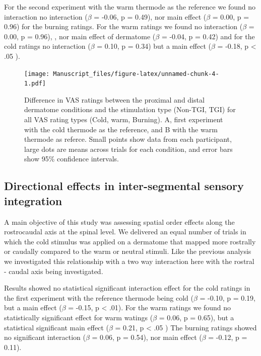 \documentclass[
]{article}
\begin{document}
For the second experiment with the warm thermode as the reference we
found no interaction no interaction (\(\beta\) = -0.06, p = 0.49), nor
main effect (\(\beta\) = 0.00, p = 0.96) for the burning ratings. For
the warm ratings we found no interaction (\(\beta\) = 0.00, p = 0.96), ,
nor main effect of dermatome (\(\beta\) = -0.04, p = 0.42) and for the
cold ratings no interaction (\(\beta\) = 0.10, p = 0.34) but a main
effect (\(\beta\) = -0.18, p \textless{} .05 ).

\begin{figure}
\centering
\texttt{[image: Manuscript\_files/figure-latex/unnamed-chunk-4-1.pdf]}
\caption{Difference in VAS ratings between the proximal and distal
dermatome conditions and the stimulation type (Non-TGI, TGI) for all VAS
rating types (Cold, warm, Burning). A, first experiment with the cold
thermode as the reference, and B with the warm thermode as referce.
Small points show data from each participant, large dots are means
across trials for each condition, and error bars show 95\% confidence
intervals.}
\end{figure}

\hypertarget{directional-effects-in-inter-segmental-sensory-integration}{%
\subsection{Directional effects in inter-segmental sensory
integration}\label{directional-effects-in-inter-segmental-sensory-integration}}

A main objective of this study was assessing spatial order effects along
the rostrocaudal axis at the spinal level. We delivered an equal number
of trials in which the cold stimulus was applied on a dermatome that
mapped more rostrally or caudally compared to the warm or neutral
stimuli. Like the previous analysis we investigated this relationship
with a two way interaction here with the rostral - caudal axis being
investigated.

Results showed no statistical significant interaction effect for the
cold ratings in the first experiment with the reference thermode being
cold (\(\beta\) = -0.10, p = 0.19, but a main effect (\(\beta\) = -0.15,
p \textless{} .01). For the warm ratings we found no statistically
significant effect for warm watings (\(\beta\) = 0.06, p = 0.65), but a
statistical significant main effect (\(\beta\) = 0.21, p \textless{} .05
) The burning ratings showed no significant interaction (\(\beta\) =
0.06, p = 0.54), nor main effect (\(\beta\) = -0.12, p = 0.11).
\end{document}
